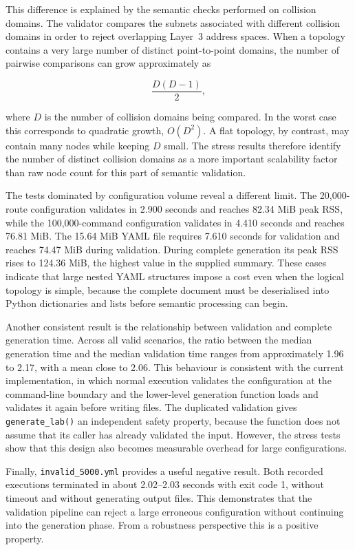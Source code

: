 This difference is explained by the semantic checks performed on collision
domains. The validator compares the subnets associated with different
collision domains in order to reject overlapping Layer~3 address spaces.
When a topology contains a very large number of distinct point-to-point
domains, the number of pairwise comparisons can grow approximately as

\[
    \frac{D(D-1)}{2},
\]

where \(D\) is the number of collision domains being compared. In the
worst case this corresponds to quadratic growth, \(O(D^2)\). A flat topology,
by contrast, may contain many nodes while keeping \(D\) small. The stress
results therefore identify the number of distinct collision domains as a more
important scalability factor than raw node count for this part of semantic
validation.

The tests dominated by configuration volume reveal a different limit. The
20,000-route configuration validates in 2.900 seconds and reaches 82.34 MiB
peak RSS, while the 100,000-command configuration validates in 4.410 seconds
and reaches 76.81 MiB. The 15.64 MiB YAML file requires 7.610 seconds for
validation and reaches 74.47 MiB during validation. During complete generation
its peak RSS rises to 124.36 MiB, the highest value in the supplied summary.
These cases indicate that large nested YAML structures impose a cost even when
the logical topology is simple, because the complete document must be
deserialised into Python dictionaries and lists before semantic processing can
begin.

Another consistent result is the relationship between validation and complete
generation time. Across all valid scenarios, the ratio between the median
generation time and the median validation time ranges from approximately
1.96 to 2.17, with a mean close to 2.06. This behaviour is consistent with the
current implementation, in which normal execution validates the configuration
at the command-line boundary and the lower-level generation function loads and
validates it again before writing files. The duplicated validation gives
\texttt{generate\_lab()} an independent safety property, because the function
does not assume that its caller has already validated the input. However, the
stress tests show that this design also becomes measurable overhead for large
configurations.

Finally, \texttt{invalid\_5000.yml} provides a useful negative result. Both
recorded executions terminated in about 2.02--2.03 seconds with exit code 1,
without timeout and without generating output files. This demonstrates that
the validation pipeline can reject a large erroneous configuration without
continuing into the generation phase. From a robustness perspective this is a
positive property.

